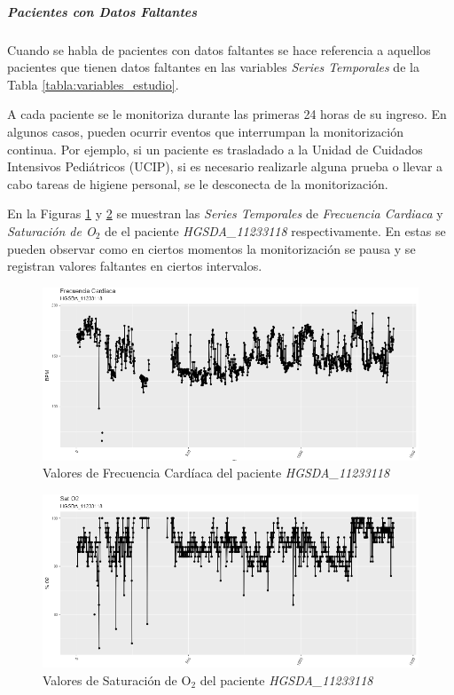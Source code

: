 \subparagraph*{Pacientes con Datos Faltantes} 

Cuando se habla de pacientes con datos faltantes se hace referencia a aquellos pacientes que tienen datos faltantes en las variables \textit{Series Temporales} de la Tabla \ref{tabla:variables_estudio}. 

A cada paciente se le monitoriza durante las primeras 24 horas de su ingreso. En algunos casos, pueden ocurrir eventos que interrumpan la monitorización continua. Por ejemplo, si un paciente es trasladado a la Unidad de Cuidados Intensivos Pediátricos (UCIP), si es necesario realizarle alguna prueba o llevar a cabo tareas de higiene personal, se le desconecta de la monitorización. 

En la Figuras \ref{fig:fc-HGSDA} y \ref{fig:satO2-HGSDA} se muestran las \textit{Series Temporales} de \textit{Frecuencia Cardiaca} y \textit{Saturación de O$_2$} de el paciente \textit{HGSDA\_11233118} respectivamente. En estas se pueden observar como en ciertos momentos la monitorización se pausa y se registran valores faltantes en ciertos intervalos. 
\begin{figure}[H]
    \centering
    \includegraphics[scale=0.85]{./img/Heart-Rate-HGSDA.png}
    \caption{Valores de Frecuencia Cardíaca del paciente \textit{HGSDA\_11233118}}
    \label{fig:fc-HGSDA}
\end{figure}

\begin{figure}[H]
    \centering
    \includegraphics[scale=0.85]{./img/SatO2-HGSDA.png}
    \caption{Valores de Saturación de O$_2$ del paciente \textit{HGSDA\_11233118}}
    \label{fig:satO2-HGSDA}
\end{figure}


